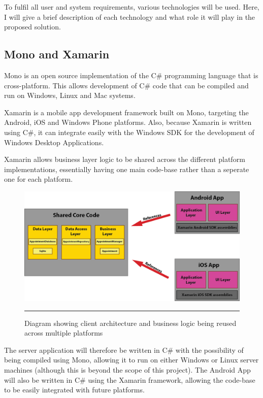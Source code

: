 To fulfil all user and system requirements, various technologies will be used. Here, I will give a brief description of each technology and what role it will play in the proposed solution.

\subsection{Mono and Xamarin}

Mono is an open source implementation of the C\# programming language that is cross-platform. This allows development of C\# code that can be compiled and run on Windows, Linux and Mac systems.

Xamarin is a mobile app development framework built on Mono, targeting the Android, iOS and Windows Phone platforms. Also, because Xamarin is written using C\#, it can integrate easily with the Windows SDK for the development of Windows Desktop Applications. 

Xamarin allows business layer logic to be shared across the different platform implementations, essentially having one main code-base rather than a seperate one for each platform.

\begin{figure}[htbp]
	\centering
		\includegraphics[width=\textwidth,height=\textheight,keepaspectratio]{Figures/AppOverview.png}
		\rule{35em}{0.5pt}
		\caption[Diagram showing client architecture and business logic being reused across multiple platforms]{Diagram showing client architecture and business logic being reused across multiple platforms}
	\label{fig:appoverview}
\end{figure}

The server application will therefore be written in C\# with the possibility of being compiled using Mono, allowing it to run on either Windows or Linux server machines (although this is beyond the scope of this project). The Android App will also be written in C\# using the Xamarin framework, allowing the code-base to be easily integrated with future platforms.

